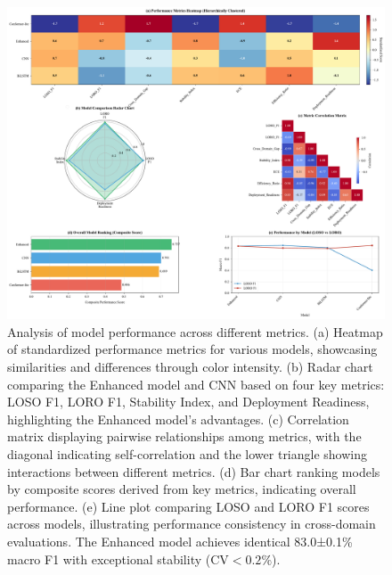 \documentclass[journal]{IEEEtran}
\begin{document}
\begin{figure}[ht]
\centering
\includegraphics[width=\linewidth]{figures/fig5_cross_domain.pdf}%
\caption{Analysis of model performance across different metrics. 
(a) Heatmap of standardized performance metrics for various models, showcasing similarities and differences through color intensity. 
(b) Radar chart comparing the Enhanced model and CNN based on four key metrics: LOSO F1, LORO F1, Stability Index, and Deployment Readiness, highlighting the Enhanced model’s advantages. 
(c) Correlation matrix displaying pairwise relationships among metrics, with the diagonal indicating self-correlation and the lower triangle showing interactions between different metrics. 
(d) Bar chart ranking models by composite scores derived from key metrics, indicating overall performance. 
(e) Line plot comparing LOSO and LORO F1 scores across models, illustrating performance consistency in cross-domain evaluations. The Enhanced model achieves identical 83.0±0.1\% macro F1 with exceptional stability ($\text{CV}<0.2\%$).}
\label{fig:cross_domain}
\end{figure}
\end{document}
